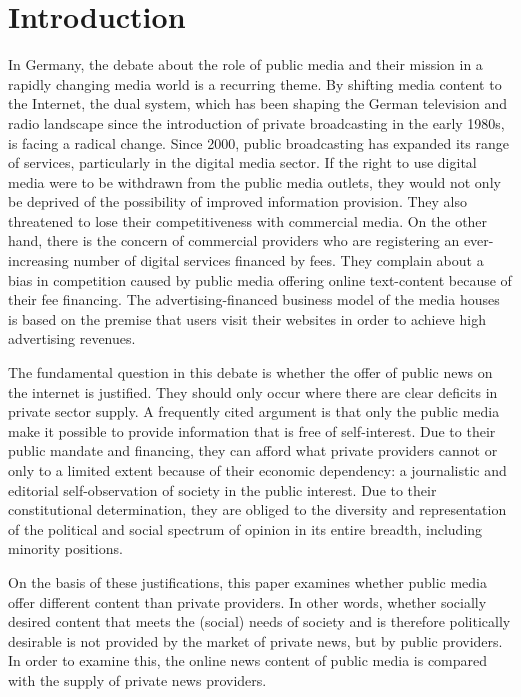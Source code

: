 \documentclass[12pt,a4paper,notitlepage]{article}
\begin{document}
\section{Introduction}

In Germany, the debate about the role of public media and their mission in a rapidly changing media world is a recurring theme. By shifting media content to the Internet, the dual system, which has been shaping the German television and radio landscape since the introduction of private broadcasting in the early 1980s, is facing a radical change. Since 2000, public broadcasting has expanded its range of services, particularly in the digital media sector. If the right to use digital media were to be withdrawn from the public media outlets, they would not only be deprived of the possibility of improved information provision. They also threatened to lose their competitiveness with commercial media. On the other hand, there is the concern of commercial providers who are registering an ever-increasing number of digital services financed by fees. They complain about a bias in competition caused by public media offering online text-content because of their fee financing. The advertising-financed business model of the media houses is based on the premise that users visit their websites in order to achieve high advertising revenues.

The fundamental question in this debate is whether the offer of public news on the internet is justified. They should only occur where there are clear deficits in private sector supply. A frequently cited argument is that only the public media make it possible to provide information that is free of self-interest. Due to their public mandate and financing, they can afford what private providers cannot or only to a limited extent because of their economic dependency: a journalistic and editorial self-observation of society in the public interest. Due to their constitutional determination, they are obliged to the diversity and representation of the political and social spectrum of opinion in its entire breadth, including minority positions.

On the basis of these justifications, this paper examines whether public media offer different content than private providers. In other words, whether socially desired content that meets the (social) needs of society and is therefore politically desirable is not provided by the market of private news, but by public providers. In order to examine this, the online news content of public media is compared with the supply of private news providers.
\end{document}

